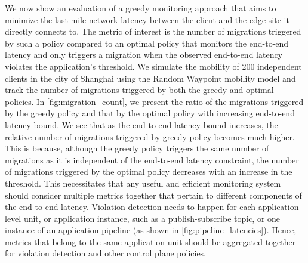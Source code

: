 \par We now show an evaluation of a greedy monitoring approach that aims to minimize the last-mile network latency between the client and the edge-site it directly connects to. The metric of interest is the number of migrations triggered by such a policy compared to an optimal policy that monitors the end-to-end latency and only triggers a migration when the observed end-to-end latency violates the application's threshold. We simulate the mobility of 200 independent clients in the city of Shanghai using the Random Waypoint mobility model and track the number of migrations triggered by both the greedy and optimal policies. In \cref{fig:migration_count}, we present the ratio of the migrations triggered by the greedy policy and that by the optimal policy with increasing end-to-end latency bound. We see that as the end-to-end latency bound increases, the relative number of migrations triggered by greedy policy becomes much higher. This is because, although the greedy policy triggers the same number of migrations as it is independent of the end-to-end latency constraint, the number of migrations triggered by the optimal policy decreases with an increase in the threshold. This necessitates that any useful and efficient monitoring system should consider multiple metrics together that pertain to different components of the end-to-end latency. Violation detection needs to happen for each application-level unit, or application instance, such as a publish-subscribe topic, or one instance of an application pipeline (as shown in \cref{fig:pipeline_latencies}). Hence, metrics that belong to the same application unit should be aggregated together for violation detection and other control plane policies.

